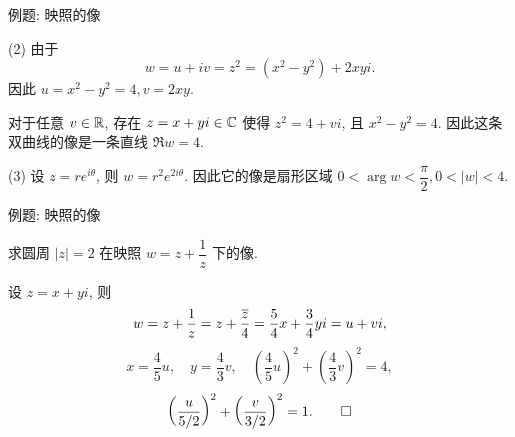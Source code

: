 \begin{frame}{例题: 映照的像}
\begin{solutione}
(2) 由于
\[w=u+iv=z^2=(x^2-y^2)+2xyi.\]
\onslide<+->
因此 $u=x^2-y^2=4,v=2xy$.

\onslide<+->
\indent
对于任意 $v\in{\mathbb{R}}$, 存在 $z=x+yi\in{\mathbb{C}}$ 使得 $z^2=4+vi$, 且 $x^2-y^2=4$.
\onslide<+->
因此这条双曲线的像是一条直线 $\Re w=4$.

(3) 设 $z=re^{i\theta}$, 则 $w=r^2e^{2i\theta}$.
\onslide<+->
因此它的像是扇形区域 $0<\arg w<\dfrac\pi2,0<|w|<4$.
\vspace{-5pt}
\end{solutione}
\end{frame}


\begin{frame}{例题: 映照的像}
\beqskip{7pt}
\begin{example}
求圆周 $|z|=2$ 在映照 $w=z+\dfrac1z$ 下的像.
\end{example}
\begin{solution}
设 $z=x+yi$, 则
\[w=z+\frac1z=z+\frac{\overline z}4=\frac54x+\frac34yi=u+vi,\]
\onslide<+->
\[x=\frac45u,\quad y=\frac43v,\quad \left(\frac45u\right)^2+\left(\frac43v\right)^2=4,\]
\onslide<+->
\[\left(\frac u{5/2}\right)^2+\left(\frac v{3/2}\right)^2=1.\qedhere\]
\end{solution}
\endgroup
\end{frame}


